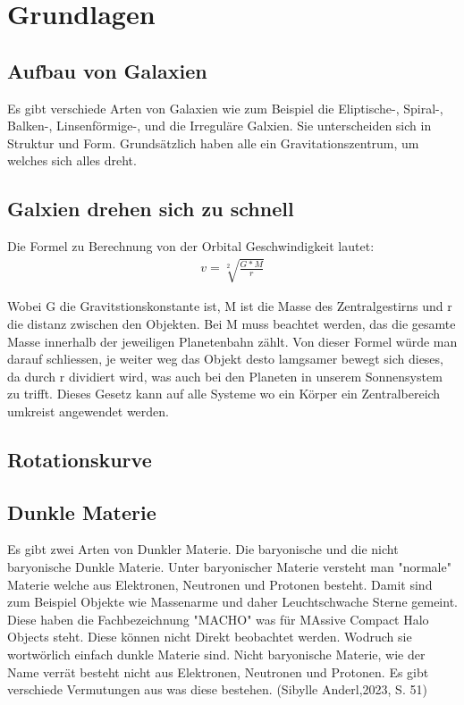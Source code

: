 
\section{Grundlagen}

\subsection{Aufbau von Galaxien}

Es gibt verschiede Arten von Galaxien wie zum Beispiel die Eliptische-, Spiral-, Balken-, Linsenförmige-, 
und die Irreguläre Galxien. Sie unterscheiden sich in Struktur und Form. Grundsätzlich haben alle ein Gravitationszentrum, um welches sich alles 
dreht.     



\subsection{Galxien drehen sich zu schnell}

Die Formel zu Berechnung von der Orbital Geschwindigkeit lautet:
\begin{align*}    
    v = \sqrt[2]{\frac{G * M}{r}}
\end{align*}

Wobei G die Gravitstionskonstante ist, M ist die Masse des Zentralgestirns und r die distanz zwischen den Objekten. Bei M muss 
beachtet werden, das die gesamte Masse innerhalb der jeweiligen Planetenbahn zählt. 
Von dieser Formel würde man darauf schliessen, je weiter weg das Objekt desto lamgsamer bewegt sich 
dieses, da durch r dividiert wird, was auch bei den Planeten in unserem Sonnensystem zu trifft. Dieses Gesetz kann auf alle
Systeme wo ein Körper ein Zentralbereich umkreist angewendet werden.  
\subsection{Rotationskurve}


\subsection{Dunkle Materie}

Es gibt zwei Arten von Dunkler Materie. Die baryonische und die nicht baryonische Dunkle
Materie. Unter baryonischer Materie versteht man "normale" Materie welche aus Elektronen, Neutronen 
und Protonen besteht. Damit sind zum Beispiel Objekte wie Massenarme und daher Leuchtschwache Sterne
gemeint. Diese haben die Fachbezeichnung "MACHO" was für MAssive Compact Halo Objects steht. Diese können
nicht Direkt beobachtet werden. Wodruch sie wortwörlich einfach dunkle Materie sind.
Nicht baryonische Materie, wie der Name verrät besteht nicht aus Elektronen, Neutronen und Protonen. Es gibt
verschiede Vermutungen aus was diese bestehen. (Sibylle Anderl,2023, S. 51) 




